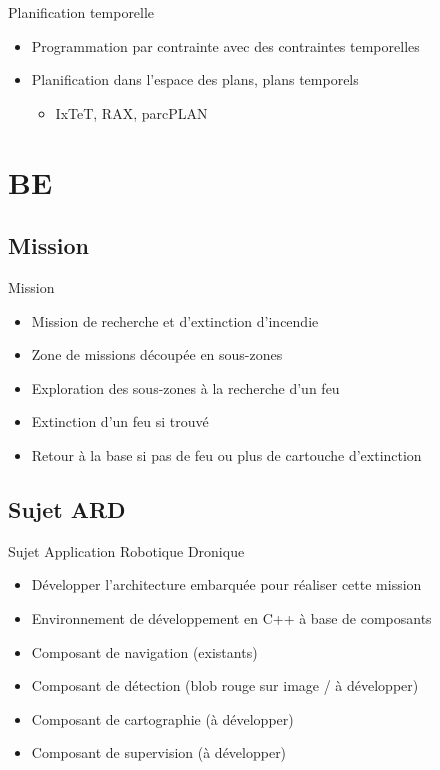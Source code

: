 \documentclass[compress]{beamer}
\begin{document}
\begin{frame}{Planification temporelle}
\begin{itemize}
\item Programmation par contrainte avec des contraintes temporelles
\item Planification dans l'espace des plans, plans temporels
	\begin{itemize}
	\item IxTeT, RAX, parcPLAN
	\end{itemize}
\end{itemize}
\end{frame}

\section{BE}
\begin{frame}
\tableofcontents[hideothersubsections]
\end{frame}

\subsection{Mission}
\begin{frame}{Mission}
\begin{itemize}
\item Mission de recherche et d'extinction d'incendie
\item Zone de missions découpée en sous-zones
\item Exploration des sous-zones à la recherche d'un feu
\item Extinction d'un feu si trouvé
\item Retour à la base si pas de feu ou plus de cartouche d'extinction
\end{itemize}
\end{frame}

\subsection{Sujet ARD}
\begin{frame}{Sujet Application Robotique Dronique}
\begin{itemize}
\item Développer l'architecture embarquée pour réaliser cette mission
\item Environnement de développement en C++ à base de composants
\item Composant de navigation (existants)
\item Composant de détection (blob rouge sur image / à développer)
\item Composant de cartographie (à développer)
\item Composant de supervision (à développer)
\end{itemize}
\end{frame}
\end{document}
